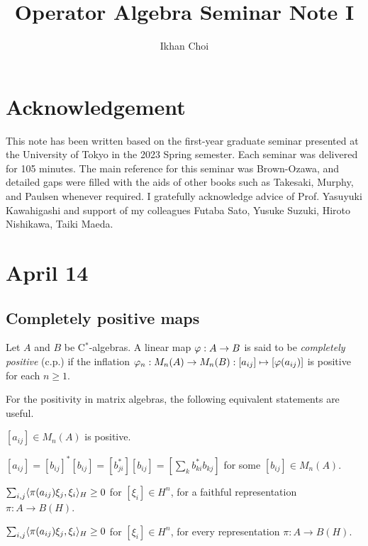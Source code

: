\documentclass{../../../small}
\begin{document}
\title{Operator Algebra Seminar Note I}
\author{Ikhan Choi}
\maketitle
\tableofcontents


\section*{Acknowledgement}
This note has been written based on the first-year graduate seminar presented at the University of Tokyo in the 2023 Spring semester.
Each seminar was delivered for 105 minutes.
The main reference for this seminar was Brown-Ozawa, and detailed gaps were filled with the aids of other books such as Takesaki, Murphy, and Paulsen whenever required.
I gratefully acknowledge advice of Prof. Yasuyuki Kawahigashi and support of my colleagues Futaba Sato, Yusuke Suzuki, Hiroto Nishikawa, Taiki Maeda.



\newpage
\section{April 14}

\subsection{Completely positive maps}

\begin{defn}
Let $A$ and $B$ be C$^*$-algebras.
A linear map $\varphi:A\to B$ is said to be \emph{completely positive} (c.p.) if the inflation $\varphi_n:M_n(A)\to M_n(B):[a_{ij}]\mapsto[\varphi(a_{ij})]$ is positive for each $n\ge1$.
\end{defn}

\begin{rmk}
For the positivity in matrix algebras, the following equivalent statements are useful.
\begin{parts}
\item $[a_{ij}]\in M_n(A)$ is positive.
\item $[a_{ij}]=[b_{ij}]^*[b_{ij}]=[b_{ji}^*][b_{ij}]=[\sum_kb_{ki}^*b_{kj}]$ for some $[b_{ij}]\in M_n(A)$.
\item $\sum_{i,j}\langle\pi(a_{ij})\xi_j,\xi_i\rangle_H\ge0$ for $[\xi_i]\in H^n$, for a faithful representation $\pi:A\to B(H)$.
\item $\sum_{i,j}\langle\pi(a_{ij})\xi_j,\xi_i\rangle_H\ge0$ for $[\xi_i]\in H^n$, for every representation $\pi:A\to B(H)$.
\end{parts}
\end{rmk}
\end{document}
